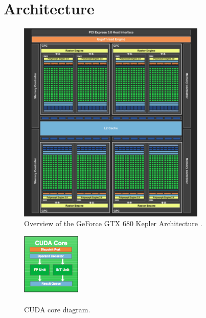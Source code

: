 \documentclass[../thesis]{subfiles}
\begin{document}
	\section{Architecture}
	\label{sec:cuda:arch}

	\begin{figure}[!htp]
		\centering
		\includegraphics[width=0.8\textwidth]{assets/images/cuda/arch/gtx680.png}
		\caption[Overview of the GeForce GTX 680 Kepler Architecture]{Overview of the GeForce GTX 680 Kepler Architecture \cite{NVIDIA:GTX680}.}
		\label{fig:gtx680}
	\end{figure}
	
	\begin{figure}
		\centering
		\includegraphics[width=0.25\textwidth]{assets/images/cuda/arch/cuda-core.png}
		\caption{\\\smaller CUDA core diagram.}
		\label{fig:cudacore}
	\end{figure}
\end{document}
